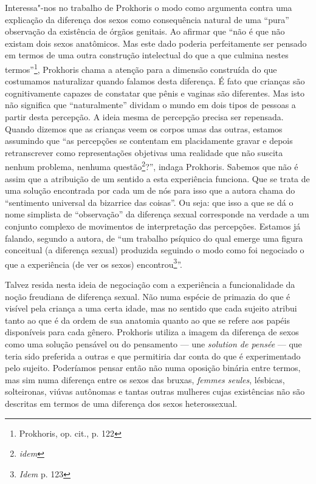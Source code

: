 Interessa"-nos no trabalho de Prokhoris o modo como argumenta contra uma
explicação da diferença dos sexos como consequência natural de uma
``pura'' observação da existência de órgãos genitais. Ao afirmar que
``não é que não existam dois sexos anatômicos. Mas este dado poderia
perfeitamente ser pensado em termos de uma outra construção intelectual
do que a que culmina nestes termos''\footnote{Prokhoris, op. cit., p.
  122}, Prokhoris chama a atenção para a dimensão construída do que
costumamos naturalizar quando falamos desta diferença. É fato que
crianças são cognitivamente capazes de constatar que pênis e vaginas são
diferentes. Mas isto não significa que ``naturalmente'' dividam o mundo
em dois tipos de pessoas a partir desta percepção. A ideia mesma de
percepção precisa ser repensada. Quando dizemos que as crianças veem os
corpos umas das outras, estamos assumindo que ``as percepções se
contentam em placidamente gravar e depois retranscrever como
representações objetivas uma realidade que não suscita nenhum problema,
nenhuma questão\footnote{\emph{idem}}?'', indaga Prokhoris. Sabemos que
não é assim que a atribuição de um sentido a esta experiência funciona.
Que se trata de uma solução encontrada por cada um de nós para isso que
a autora chama do ``sentimento universal da bizarrice das coisas''. Ou
seja: que isso a que se dá o nome simplista de ``observação'' da
diferença sexual corresponde na verdade a um conjunto complexo de
movimentos de interpretação das percepções. Estamos já falando, segundo
a autora, de ``um trabalho psíquico do qual emerge uma figura conceitual
(a diferença sexual) produzida seguindo o modo como foi negociado o que
a experiência (de ver os sexos) encontrou\footnote{\emph{Idem} p. 123}''.

Talvez resida nesta ideia de negociação com a experiência a
funcionalidade da noção freudiana de diferença sexual. Não numa espécie
de primazia do que é visível pela criança a uma certa idade, mas no
sentido que cada sujeito atribui tanto ao que é da ordem de sua anatomia
quanto ao que se refere aos papéis disponíveis para cada gênero.
Prokhoris utiliza a imagem da diferença de sexos como uma solução
pensável ou do pensamento --- une \emph{solution de pensée} --- que teria
sido preferida a outras e que permitiria dar conta do que é
experimentado pelo sujeito. Poderíamos pensar então não numa oposição
binária entre termos, mas sim numa diferença entre os sexos das bruxas,
\emph{femmes seules}, lésbicas, solteironas, viúvas autônomas e tantas
outras mulheres cujas existências não são descritas em termos de uma
diferença dos sexos heterossexual.

